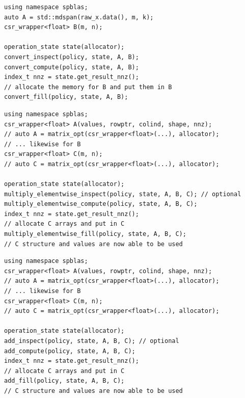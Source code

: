 \begin{listing}[H]
\caption{Sparse Matrix Format Conversion, $B = \text{sparse}(A)$. Note that this will not remove explicit zeros except for conversion from dense. The above convert\_* functions might accept the predicate function additionally to remove some entries during conversion, which can give some performance benefit without creating a matrix two times.}
\begin{verbatim}
using namespace spblas;
auto A = std::mdspan(raw_x.data(), m, k);
csr_wrapper<float> B(m, n);

operation_state state(allocator);
convert_inspect(policy, state, A, B);
convert_compute(policy, state, A, B);
index_t nnz = state.get_result_nnz();
// allocate the memory for B and put them in B
convert_fill(policy, state, A, B); 
\end{verbatim}
\end{listing}



\begin{listing}[H]
\caption{Element-wise Multiplication, $C = A~.*B$.}
\begin{verbatim}
using namespace spblas;
csr_wrapper<float> A(values, rowptr, colind, shape, nnz);
// auto A = matrix_opt(csr_wrapper<float>(...), allocator);
// ... likewise for B
csr_wrapper<float> C(m, n);
// auto C = matrix_opt(csr_wrapper<float>(...), allocator);

operation_state state(allocator);
multiply_elementwise_inspect(policy, state, A, B, C); // optional
multiply_elementwise_compute(policy, state, A, B, C);
index_t nnz = state.get_result_nnz();
// allocate C arrays and put in C
multiply_elementwise_fill(policy, state, A, B, C);
// C structure and values are now able to be used
\end{verbatim}
\end{listing}


\begin{listing}[H]
\caption{Sparse Matrix -- Sparse Matrix Addition, $C = A + B$.}
\begin{verbatim}
using namespace spblas;
csr_wrapper<float> A(values, rowptr, colind, shape, nnz);
// auto A = matrix_opt(csr_wrapper<float>(...), allocator);
// ... likewise for B
csr_wrapper<float> C(m, n);
// auto C = matrix_opt(csr_wrapper<float>(...), allocator);

operation_state state(allocator);
add_inspect(policy, state, A, B, C); // optional
add_compute(policy, state, A, B, C);
index_t nnz = state.get_result_nnz();
// allocate C arrays and put in C
add_fill(policy, state, A, B, C);
// C structure and values are now able to be used
\end{verbatim}
\end{listing}


